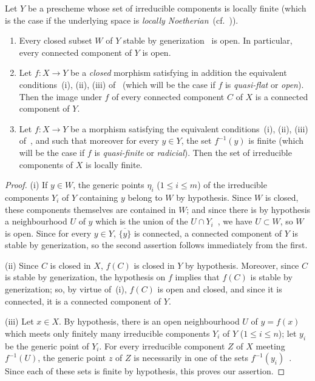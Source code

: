 \begin{proposition}[2.3.6]
\label{IV.2.3.6}
Let $Y$ be a prescheme whose set of irreducible components is locally finite \textup{(which is the case if the underlying space is \emph{locally Noetherian}~(cf.~))}.
\begin{enumerate}
  \item[\textup{(i)}] Every closed subset $W$ of $Y$ stable by generization~ is open. In particular, every connected component of $Y$ is open.
  \item[\textup{(ii)}] Let $f:X\to Y$ be a \emph{closed} morphism satisfying in addition the equivalent conditions~\textup{(i), (ii), (iii)} of~ \textup{(which will be the case if $f$ is \emph{quasi-flat} or \emph{open})}. Then the image under $f$ of every connected component $C$ of $X$ is a connected component of $Y$.
  \item[\textup{(iii)}] Let $f:X\to Y$ be a morphism satisfying the equivalent conditions~\textup{(i), (ii), (iii)} of~, and such that moreover for every $y\in Y$, the set $f^{-1}(y)$ is finite \textup{(which will be the case if $f$ is \emph{quasi-finite} or \emph{radicial})}. Then the set of irreducible components of $X$ is locally finite.
\end{enumerate}
\end{proposition}

\begin{proof}
(i) If $y\in W$, the generic points $\eta_i$ ($1\leq i\leq m$) of the irreducible components $Y_i$ of $Y$ containing $y$ belong to $W$ by hypothesis.
Since $W$ is closed, these components themselves are contained in $W$; and since there is by hypothesis a neighbourhood $U$ of $y$ which is the union of the $U\cap Y_i$~, we have $U\subset W$, so $W$ is open.
Since for every $y\in Y$, $\overline{\{y\}}$ is connected, a connected component of $Y$ is stable by generization, so the second assertion follows immediately from the first.

(ii) Since $C$ is closed in $X$, $f(C)$ is closed in $Y$ by hypothesis.
Moreover, since $C$ is stable by generization, the hypothesis on $f$ implies that $f(C)$ is stable by generization; so, by virtue of~(i), $f(C)$ is open and closed, and since it is connected, it is a connected component of $Y$.

(iii) Let $x\in X$.
By hypothesis, there is an open neighbourhood $U$ of $y=f(x)$ which meets only finitely many irreducible components $Y_i$ of $Y$ ($1\leq i\leq n$); let $y_i$ be the generic point of $Y_i$.
For every irreducible component $Z$ of $X$ meeting $f^{-1}(U)$, the generic point $z$ of $Z$ is necessarily in one of the sets $f^{-1}(y_i)$~.
Since each of these sets is finite by hypothesis, this proves our assertion.
\end{proof}

